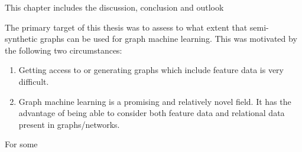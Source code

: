 
This chapter includes the discussion, conclusion and outlook 

The primary target of this thesis was to assess to what extent that semi-
synthetic graphs can be used for graph machine learning. This was motivated by 
the following two circumstances:

\begin{enumerate}
    \item Getting access to or generating graphs which include feature data is 
        very difficult.
    \item Graph machine learning is a promising and relatively novel field. It 
        has the advantage of being able to consider both feature data and 
        relational data present in graphs/networks.
\end{enumerate}

\noindent For some 
